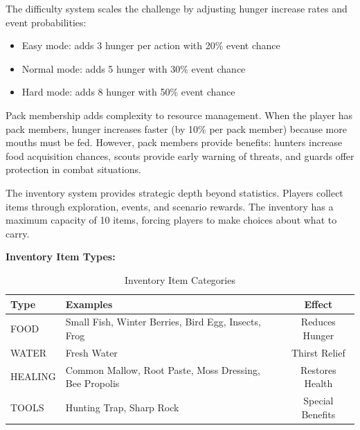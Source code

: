 \documentclass[12pt,a4paper]{article}
\begin{document}
The difficulty system scales the challenge by adjusting hunger increase rates and event probabilities:
\begin{itemize}
	\item Easy mode: adds 3 hunger per action with 20\% event chance
	\item Normal mode: adds 5 hunger with 30\% event chance
	\item Hard mode: adds 8 hunger with 50\% event chance
\end{itemize}

Pack membership adds complexity to resource management. When the player has pack members, hunger increases faster (by 10\% per pack member) because more mouths must be fed. However, pack members provide benefits: hunters increase food acquisition chances, scouts provide early warning of threats, and guards offer protection in combat situations.

The inventory system provides strategic depth beyond statistics. Players collect items through exploration, events, and scenario rewards. The inventory has a maximum capacity of 10 items, forcing players to make choices about what to carry.

\textbf{Inventory Item Types:}

\begin{table}[h]
	\centering
	\caption{Inventory Item Categories}
	\begin{tabular}{@{}lp{8cm}c@{}}
		\toprule
		\textbf{Type} & \textbf{Examples}                                      & \textbf{Effect}  \\ \midrule
		FOOD          & Small Fish, Winter Berries, Bird Egg, Insects, Frog    & Reduces Hunger   \\
		WATER         & Fresh Water                                            & Thirst Relief    \\
		HEALING       & Common Mallow, Root Paste, Moss Dressing, Bee Propolis & Restores Health  \\
		TOOLS         & Hunting Trap, Sharp Rock                               & Special Benefits \\
		\bottomrule
	\end{tabular}
\end{table}

\vspace{0.3cm}
\end{document}
